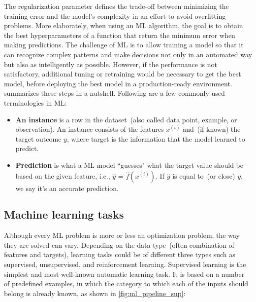 \hspace*{3.5mm} The regularization parameter defines the trade-off between minimizing the training error and the model's complexity in an effort to avoid overfitting problems. More elaborately, when using an ML algorithm, the goal is to obtain the best hyperparameters of a function that return the minimum error when making predictions. 
The challenge of ML is to allow training a model so that it can recognize complex patterns and make decisions not only in an automated way but also as intelligently as possible. 
However, if the performance is not satisfactory, additional tuning or retraining would be necessary to get the best model, before %
deploying the best model in a production-ready environment. 
 summarizes these steps in a nutshell. Following are a few commonly used terminologies in ML: 

\begin{itemize}[noitemsep]
    \item \textbf{An instance} is a row in the dataset~(also called data point, example, or observation). An instance consists of the features $x^{(i)}$ and~(if known) the target outcome ${y}$, where target is the information that the model learned to predict.

    \item \textbf{Prediction} is what a ML model ``guesses" what the target value should be based on the given feature, i.e., $\hat{y}$ = $\hat{f}\left(x^{(i)}\right)$. If $\hat{y}$ is equal to~(or close) ${y}$, we say it's an accurate prediction.   
\end{itemize}

\subsection{Machine learning tasks}
Although every ML problem is more or less an optimization problem, the way they are solved can vary. Depending on the data type~(often combination of features and targets), learning tasks could be of different three types such as supervised, unsupervised, and reinforcement learning. Supervised learning is the simplest and most well-known automatic learning task. It is based on a number of predefined examples, in which the category to which each of the inputs should belong is already known, as shown in \cref{fig:ml_pipeline_sup}:


